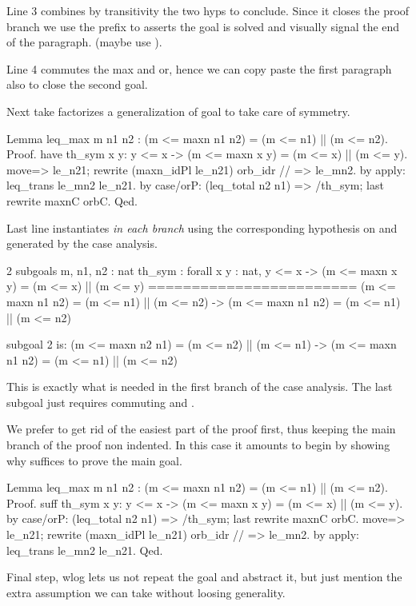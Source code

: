 Line 3 combines by transitivity the two hyps to conclude.
Since it closes the proof branch we use the prefix 
to asserts the goal is solved and visually signal the end of the paragraph.
(maybe use ).

Line 4 commutes the max and or, hence we can copy paste the first paragraph
also to close the second goal.

Next take factorizes a generalization of goal to take care of symmetry.

\begin{coq}{}{}
Lemma leq_max m n1 n2 : (m <= maxn n1 n2) = (m <= n1) || (m <= n2).
Proof.
have th_sym x y: y <= x -> (m <= maxn x y) = (m <= x) || (m <= y).
  move=> le_n21; rewrite (maxn_idPl le_n21) orb_idr // => le_mn2.
  by apply: leq_trans le_mn2 le_n21.
by case/orP: (leq_total n2 n1) => /th_sym; last rewrite maxnC orbC.
Qed.
\end{coq}

Last line instantiates  \emph{in each branch} using the corresponding
hypothesis on  and  generated by the case analysis.

\begin{coqout}{}{}
2 subgoals
m, n1, n2 : nat
th_sym : forall x y : nat,
         y <= x -> (m <= maxn x y) = (m <= x) || (m <= y)
========================
(m <= maxn n1 n2) = (m <= n1) || (m <= n2) ->
(m <= maxn n1 n2) = (m <= n1) || (m <= n2)

subgoal 2 is:
(m <= maxn n2 n1) = (m <= n2) || (m <= n1) ->
(m <= maxn n1 n2) = (m <= n1) || (m <= n2)
\end{coqout}

This is exactly what is needed in the first branch of the case analysis.
The last subgoal just requires commuting  and \C{||}.

We prefer to get rid of the easiest part of the proof first, thus
keeping the main branch of the proof non indented. In this case
it amounts to begin by showing why  suffices to prove the main
goal.

\begin{coq}{}{}
Lemma leq_max m n1 n2 : (m <= maxn n1 n2) = (m <= n1) || (m <= n2).
Proof.
suff th_sym x y: y <= x -> (m <= maxn x y) = (m <= x) || (m <= y).
  by case/orP: (leq_total n2 n1) => /th_sym; last rewrite maxnC orbC.
move=> le_n21; rewrite (maxn_idPl le_n21) orb_idr // => le_mn2.
by apply: leq_trans le_mn2 le_n21.
Qed.
\end{coq}

Final step, wlog lets us not repeat the goal and abstract it, but
just mention the extra assumption we can take without loosing
generality.


